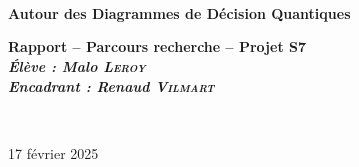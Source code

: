 \begin{center}

~\\[1cm]


\textsc{\Large }\\[0.5cm]

\HRule \\[0.4cm]

{\huge \bfseries Autour des Diagrammes de Décision Quantiques\\
[0.4cm] }

{\large \bfseries Rapport -- Parcours recherche -- Projet S7\\[0.4cm] }
{\large \bfseries \textsl{Élève : Malo \textsc{Leroy}}\\ }
{\large \bfseries \textsl{Encadrant : Renaud \textsc{Vilmart}}\\[0.4cm] }


\HRule \\[1.5cm]

\begingroup
\let\clearpage\relax
\tableofcontents
\endgroup

\vfill

{\large {17 février 2025}}

\end{center}